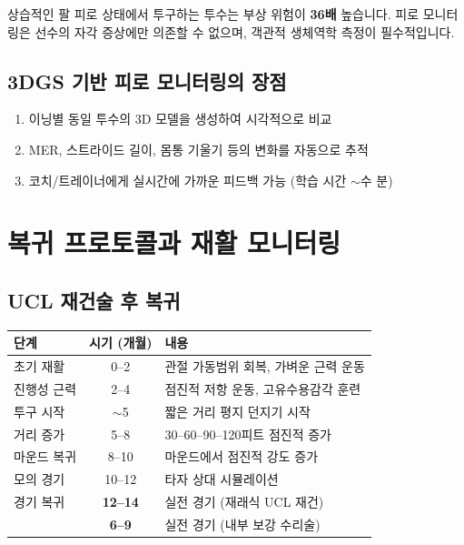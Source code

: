\documentclass[11pt, a4paper]{report}
\begin{document}
\begin{injurybox}
상습적인 팔 피로 상태에서 투구하는 투수는 부상 위험이 \textbf{36배} 높습니다. 피로 모니터링은 선수의 자각 증상에만 의존할 수 없으며, 객관적 생체역학 측정이 필수적입니다.
\end{injurybox}

\subsection{3DGS 기반 피로 모니터링의 장점}

\begin{enumerate}[leftmargin=*]
  \item 이닝별 동일 투수의 3D 모델을 생성하여 시각적으로 비교
  \item MER, 스트라이드 길이, 몸통 기울기 등의 변화를 자동으로 추적
  \item 코치/트레이너에게 실시간에 가까운 피드백 가능 (학습 시간 $\sim$수 분)
\end{enumerate}


\section{복귀 프로토콜과 재활 모니터링}

\subsection{UCL 재건술 후 복귀}

\begin{center}
\renewcommand{\arraystretch}{1.3}
\begin{tabular}{lcl}
\toprule
\textbf{단계} & \textbf{시기 (개월)} & \textbf{내용} \\
\midrule
초기 재활 & 0--2 & 관절 가동범위 회복, 가벼운 근력 운동 \\
진행성 근력 & 2--4 & 점진적 저항 운동, 고유수용감각 훈련 \\
투구 시작 & $\sim$5 & 짧은 거리 평지 던지기 시작 \\
거리 증가 & 5--8 & 30--60--90--120피트 점진적 증가 \\
마운드 복귀 & 8--10 & 마운드에서 점진적 강도 증가 \\
모의 경기 & 10--12 & 타자 상대 시뮬레이션 \\
경기 복귀 & \textbf{12--14} & 실전 경기 (재래식 UCL 재건) \\
 & \textbf{6--9} & 실전 경기 (내부 보강 수리술) \\
\bottomrule
\end{tabular}
\end{center}
\end{document}
